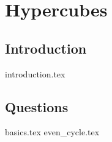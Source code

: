 \documentclass{exam}
\begin{document}
\section{Hypercubes}
\subsection{Introduction}
{introduction.tex}
\subsection{Questions}
\begin{questions}
{basics.tex}
{even_cycle.tex}
\end{questions}




\end{document}
